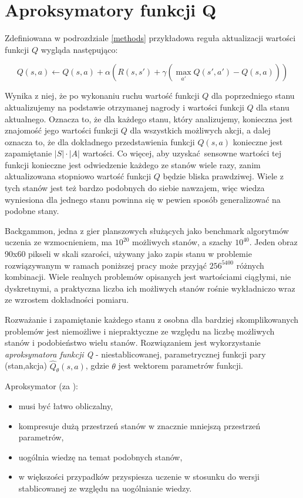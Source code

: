 \section{Aproksymatory funkcji Q}

Zdefiniowana w podrozdziale \ref{methods} przykładowa reguła aktualizacji wartości funkcji $Q$ wygląda następująco:

$$Q(s,a) \leftarrow Q(s,a) + \alpha (R(s,s') + \gamma (\max_{a'}Q(s',a') - Q (s,a)))$$

Wynika z niej, że po wykonaniu ruchu wartość funkcji $Q$ dla poprzedniego stanu aktualizujemy na podstawie otrzymanej nagrody i wartości funkcji $Q$ dla stanu aktualnego. Oznacza to, że dla każdego stanu, który analizujemy, konieczna jest znajomość jego wartości funkcji $Q$ dla wszystkich możliwych akcji, a dalej oznacza to, że dla dokładnego przedstawienia funkcji $Q(s,a)$  konieczne jest zapamiętanie $\left\vert{S}\right\vert \cdot \left\vert{A}\right\vert$ wartości. Co więcej, aby uzyskać sensowne wartości tej funkcji konieczne jest odwiedzenie każdego ze stanów wiele razy, zanim aktualizowana stopniowo wartość funkcji $Q$ będzie bliska prawdziwej. Wiele z tych stanów jest też bardzo podobnych do siebie nawzajem, więc wiedza wyniesiona dla jednego stanu powinna się w pewien sposób generalizować na podobne stany.

Backgammon, jedna z gier planszowych służących jako benchmark algorytmów uczenia ze wzmocnieniem, ma $10^{20}$ możliwych stanów, a szachy $10^{40}$. Jeden obraz 90x60 pikseli w skali szarości, używany jako zapis stanu w problemie rozwiązywanym w ramach poniższej pracy może przyjąć $256^{5400}$ różnych kombinacji. Wiele realnych problemów opisanych jest wartościami ciągłymi, nie dyskretnymi, a praktyczna liczba ich możliwych stanów rośnie wykładniczo wraz ze wzrostem dokładności pomiaru.

Rozważanie i zapamiętanie każdego stanu z osobna dla bardziej skomplikowanych problemów jest niemożliwe i niepraktyczne ze względu na liczbę możliwych stanów i podobieństwo wielu stanów. Rozwiązaniem jest wykorzystanie \textit {aproksymatora funkcji Q} - niestablicowanej, parametrycznej funkcji pary (stan,akcja) $\hat{Q}_{\theta}(s,a)$, gdzie $\theta$ jest wektorem parametrów funkcji.

\pagebreak

Aproksymator (za \cite{wjaskowski2016}):
\begin{itemize}
\item musi być łatwo obliczalny,
\item kompresuje dużą przestrzeń stanów w znacznie mniejszą przestrzeń parametrów,
\item uogólnia wiedzę na temat podobnych stanów,
\item w większości przypadków przyspiesza uczenie w stosunku do wersji stablicowanej ze względu na uogólnianie wiedzy.
\end{itemize}

